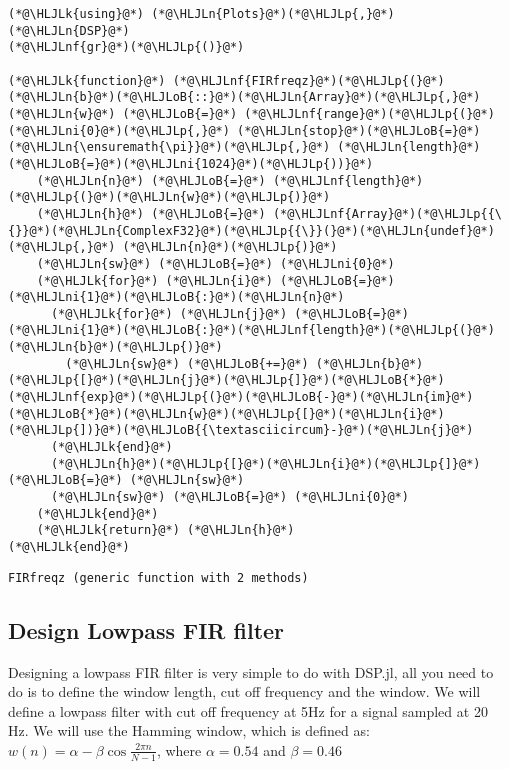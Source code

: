\documentclass[12pt,a4paper]{article}
\newcommand{\HLJLk}[1]{\textcolor[RGB]{148,91,176}{\textbf{#1}}}
\newcommand{\HLJLn}[1]{#1}
\newcommand{\HLJLnf}[1]{\textcolor[RGB]{66,102,213}{#1}}
\newcommand{\HLJLni}[1]{\textcolor[RGB]{59,151,46}{#1}}
\newcommand{\HLJLoB}[1]{\textcolor[RGB]{102,102,102}{\textbf{#1}}}
\newcommand{\HLJLp}[1]{#1}
\begin{document}
\begin{lstlisting}
(*@\HLJLk{using}@*) (*@\HLJLn{Plots}@*)(*@\HLJLp{,}@*) (*@\HLJLn{DSP}@*)
(*@\HLJLnf{gr}@*)(*@\HLJLp{()}@*)

(*@\HLJLk{function}@*) (*@\HLJLnf{FIRfreqz}@*)(*@\HLJLp{(}@*)(*@\HLJLn{b}@*)(*@\HLJLoB{::}@*)(*@\HLJLn{Array}@*)(*@\HLJLp{,}@*) (*@\HLJLn{w}@*) (*@\HLJLoB{=}@*) (*@\HLJLnf{range}@*)(*@\HLJLp{(}@*)(*@\HLJLni{0}@*)(*@\HLJLp{,}@*) (*@\HLJLn{stop}@*)(*@\HLJLoB{=}@*)(*@\HLJLn{\ensuremath{\pi}}@*)(*@\HLJLp{,}@*) (*@\HLJLn{length}@*)(*@\HLJLoB{=}@*)(*@\HLJLni{1024}@*)(*@\HLJLp{))}@*)
    (*@\HLJLn{n}@*) (*@\HLJLoB{=}@*) (*@\HLJLnf{length}@*)(*@\HLJLp{(}@*)(*@\HLJLn{w}@*)(*@\HLJLp{)}@*)
    (*@\HLJLn{h}@*) (*@\HLJLoB{=}@*) (*@\HLJLnf{Array}@*)(*@\HLJLp{{\{}}@*)(*@\HLJLn{ComplexF32}@*)(*@\HLJLp{{\}}(}@*)(*@\HLJLn{undef}@*)(*@\HLJLp{,}@*) (*@\HLJLn{n}@*)(*@\HLJLp{)}@*)
    (*@\HLJLn{sw}@*) (*@\HLJLoB{=}@*) (*@\HLJLni{0}@*)
    (*@\HLJLk{for}@*) (*@\HLJLn{i}@*) (*@\HLJLoB{=}@*) (*@\HLJLni{1}@*)(*@\HLJLoB{:}@*)(*@\HLJLn{n}@*)
      (*@\HLJLk{for}@*) (*@\HLJLn{j}@*) (*@\HLJLoB{=}@*) (*@\HLJLni{1}@*)(*@\HLJLoB{:}@*)(*@\HLJLnf{length}@*)(*@\HLJLp{(}@*)(*@\HLJLn{b}@*)(*@\HLJLp{)}@*)
        (*@\HLJLn{sw}@*) (*@\HLJLoB{+=}@*) (*@\HLJLn{b}@*)(*@\HLJLp{[}@*)(*@\HLJLn{j}@*)(*@\HLJLp{]}@*)(*@\HLJLoB{*}@*)(*@\HLJLnf{exp}@*)(*@\HLJLp{(}@*)(*@\HLJLoB{-}@*)(*@\HLJLn{im}@*)(*@\HLJLoB{*}@*)(*@\HLJLn{w}@*)(*@\HLJLp{[}@*)(*@\HLJLn{i}@*)(*@\HLJLp{])}@*)(*@\HLJLoB{{\textasciicircum}-}@*)(*@\HLJLn{j}@*)
      (*@\HLJLk{end}@*)
      (*@\HLJLn{h}@*)(*@\HLJLp{[}@*)(*@\HLJLn{i}@*)(*@\HLJLp{]}@*) (*@\HLJLoB{=}@*) (*@\HLJLn{sw}@*)
      (*@\HLJLn{sw}@*) (*@\HLJLoB{=}@*) (*@\HLJLni{0}@*)
    (*@\HLJLk{end}@*)
    (*@\HLJLk{return}@*) (*@\HLJLn{h}@*)
(*@\HLJLk{end}@*)
\end{lstlisting}

\begin{lstlisting}
FIRfreqz (generic function with 2 methods)
\end{lstlisting}


\subsection{Design Lowpass FIR filter}
Designing a lowpass FIR filter is very simple to do with DSP.jl, all you need to do is to define the window length, cut off frequency and the window. We will define a lowpass filter with cut off frequency at 5Hz for a signal sampled at 20 Hz. We will use the Hamming window, which is defined as: $w(n) = \alpha - \beta\cos\frac{2\pi n}{N-1}$, where $\alpha=0.54$ and $\beta=0.46$
\end{document}
